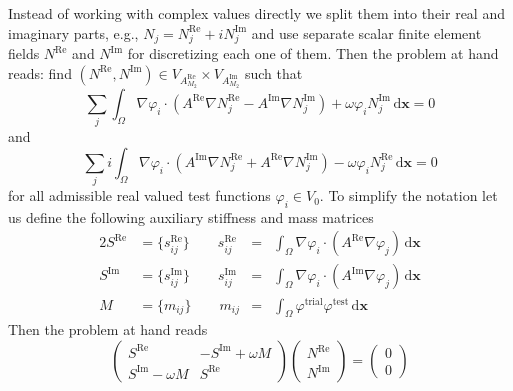 \documentclass[11pt,a4paper]{article}
\begin{document}
Instead of working with complex values directly we split them into their real and imaginary parts, e.g., $N_j=N_j^\textrm{Re}+iN_j^\textrm{Im}$ and use separate scalar finite element fields $N^\textrm{Re}$ and $N^\textrm{Im}$ for discretizing each one of them. Then the problem at hand reads: find $(N^\textrm{Re},N^\textrm{Im})\in V_{A_{M_2}^\textrm{Re}}\times V_{A_{M_2}^\textrm{Im}}$ such that
\begin{equation}
\sum_j\int_\Omega \nabla\varphi_i\cdot\left(A^\textrm{Re}\nabla N_j^\textrm{Re}-A^\textrm{Im}\nabla N_j^\textrm{Im}\right)+\omega \varphi_i N_j^\textrm{Im}\,\mathrm{d}\mathbf{x}=0
\end{equation}
and
\begin{equation}
\sum_ji\int_\Omega \nabla\varphi_i\cdot\left(A^\textrm{Im}\nabla N_j^\textrm{Re}+A^\textrm{Re}\nabla N_j^\textrm{Im}\right)-\omega \varphi_i N_j^\textrm{Re}\,\mathrm{d}\mathbf{x}=0
\end{equation}
for all admissible real valued test functions $\varphi_i\in V_{0}$.
To simplify the notation let us define the following auxiliary stiffness and mass matrices
\begin{alignat}{2}
S^\textrm{Re}&=\{s_{ij}^\textrm{Re}\} \qquad s_{ij}^\textrm{Re}&=&\int_\Omega \nabla\varphi_i\cdot(A^\textrm{Re}\nabla\varphi_j)\,\mathrm{d}\mathbf{x}\\
S^\textrm{Im}&=\{s_{ij}^\textrm{Im}\} \qquad s_{ij}^\textrm{Im}&=&\int_\Omega \nabla\varphi_i\cdot(A^\textrm{Im}\nabla\varphi_j)\,\mathrm{d}\mathbf{x}\\
M&=\{m_{ij}\} \qquad m_{ij}&=&\int_\Omega \varphi^\text{trial}\varphi^\text{test}\,\mathrm{d}\mathbf{x}
\end{alignat}
Then the problem at hand reads
\begin{equation}
\begin{pmatrix}
S^\textrm{Re} & -S^\textrm{Im}+\omega M\\
S^\textrm{Im}-\omega M &  S^\textrm{Re}
\end{pmatrix}
\begin{pmatrix}
N^\textrm{Re}\\
N^\textrm{Im}
\end{pmatrix}
=
\begin{pmatrix}
0\\
0
\end{pmatrix}
\end{equation}
\end{document}
